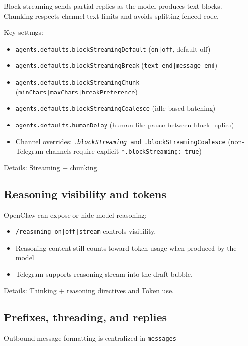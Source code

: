 Block streaming sends partial replies as the model produces text blocks.
Chunking respects channel text limits and avoids splitting fenced code.

Key settings:

\begin{itemize}
  \item \texttt{agents.defaults.blockStreamingDefault} (\texttt{on|off}, default off)
  \item \texttt{agents.defaults.blockStreamingBreak} (\texttt{text\_end|message\_end})
  \item \texttt{agents.defaults.blockStreamingChunk} (\texttt{minChars|maxChars|breakPreference})
  \item \texttt{agents.defaults.blockStreamingCoalesce} (idle-based batching)
  \item \texttt{agents.defaults.humanDelay} (human-like pause between block replies)
  \item Channel overrides: \texttt{\textit{.blockStreaming} and \texttt{}.blockStreamingCoalesce} (non-Telegram channels require explicit \texttt{*.blockStreaming: true})
\end{itemize}


Details: \href{/concepts/streaming}{Streaming + chunking}.

\subsection{Reasoning visibility and tokens}


OpenClaw can expose or hide model reasoning:

\begin{itemize}
  \item \texttt{/reasoning on|off|stream} controls visibility.
  \item Reasoning content still counts toward token usage when produced by the model.
  \item Telegram supports reasoning stream into the draft bubble.
\end{itemize}


Details: \href{/tools/thinking}{Thinking + reasoning directives} and \href{/reference/token-use}{Token use}.

\subsection{Prefixes, threading, and replies}


Outbound message formatting is centralized in \texttt{messages}:

